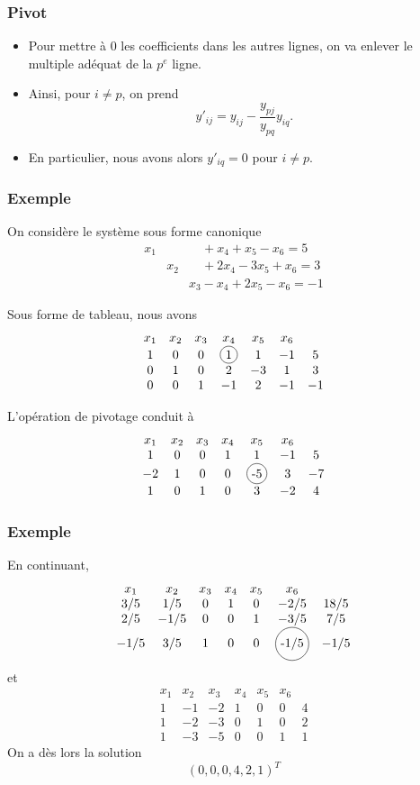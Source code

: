 \documentclass[t,usepdftitle=false]{beamer}
\newcommand*\circled[1]{\tikz[baseline=(char.base)]{
    \node[shape=circle,draw,inner sep=2pt] (char) {#1};}}
\begin{document}
\begin{frame}
\frametitle{Pivot}

\begin{itemize}
\item
Pour mettre à 0 les coefficients dans les autres lignes, on va enlever le multiple adéquat de la $p^e$ ligne.
\item
Ainsi, pour $i \ne p$, on prend
$$
y'_{ij} = y_{ij} - \frac{y_{pj}}{y_{pq}} y_{iq}.
$$
\item
En particulier, nous avons alors $y'_{iq} = 0$ pour $i \ne p$.
\end{itemize}

\end{frame}

\begin{frame}
\frametitle{Exemple}

On considère le système sous forme canonique
\begin{eqnarray*}
x_1 & & \quad + x_4 +  x_5 - x_6 = 5 \\
& x_2 & \quad + 2x_4 -3x_5 + x_6 = 3 \\
& & x_3 -x_4 +2x_5 - x_6 = -1
\end{eqnarray*}

Sous forme de tableau, nous avons
\[
\begin{matrix}
x_1 & x_2 & x_3 & x_4 & x_5 & x_6 & \\
1 & 0 & 0 & \circled{1} & 1 & -1 & 5 \\
0 & 1 & 0 & 2 & -3 & 1 & 3 \\
0 & 0 & 1 & -1 & 2 & -1 & -1
\end{matrix}
\]

L'opération de pivotage conduit à
\[
\begin{matrix}
x_1 & x_2 & x_3 & x_4 & x_5 & x_6 & \\
1 & 0 & 0 & 1 & 1 & -1 & 5 \\
-2 & 1 & 0 & 0 & \circled{-5} & 3 & -7 \\
 1 & 0 & 1 & 0 & 3 & -2 & 4
\end{matrix}
\]

\end{frame}

\begin{frame}
\frametitle{Exemple}

En continuant,
\[
\begin{matrix}
x_1 & x_2 & x_3 & x_4 & x_5 & x_6 & \\
3/5 & 1/5 & 0 & 1 & 0 & -2/5 & 18/5 \\
2/5 & -1/5 & 0 & 0 & 1 & -3/5 & 7/5 \\
-1/5 & 3/5 & 1 & 0 & 0 & \circled{-1/5} & -1/5
\end{matrix}
\]
et
\[
\begin{matrix}
x_1 & x_2 & x_3 & x_4 & x_5 & x_6 & \\
1 & -1 & -2 & 1 & 0 & 0 & 4 \\
1 & -2 & -3 & 0 & 1 & 0 & 2 \\
1 & -3 & -5 & 0 & 0 & 1 & 1
\end{matrix}
\]
On a dès lors la solution
\[
(0, 0, 0, 4, 2, 1)^T
\]

\end{frame}
\end{document}
